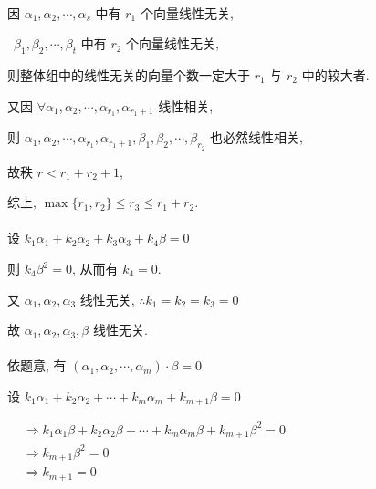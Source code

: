 	 \paragraph{} %
		 因 \( \alpha_{1}, \alpha_{2}, \cdots, \alpha_{s} \) 中有 \( r_{1} \) 个向量线性无关,

		 \quad \   \( \beta_{1}, \beta_{2}, \cdots, \beta_{t} \) 中有 \( r_{2} \) 个向量线性无关,

		 则整体组中的线性无关的向量个数一定大于 \( r_{1} \) 与 \( r_{2} \) 中的较大者.

		 又因 \( \forall \alpha_{1}, \alpha_{2}, \cdots, \alpha_{r_{1}}, \alpha_{r_{1}+1} \) 线性相关,

		 则 \( \alpha_{1}, \alpha_{2}, \cdots, \alpha_{r_{1}}, \alpha_{r_{1}+1}, \beta_{1}, \beta_{2}, \cdots, \beta_{r_{2}} \) 也必然线性相关,

		 故秩 \( r < r_{1} + r_{2} + 1 \),

		 综上, \( \max\{r_{1}, r_{2}\} \leq r_3 \leq r_{1} + r_{2} \).

	 \paragraph{} %
		 设 \( k_{1}\alpha_{1} + k_{2}\alpha_{2} + k_{3}\alpha_{3} + k_{4}\beta = 0 \)

		 则 \(k_{4}\beta^{2} = 0 \), 从而有 \( k_{4} = 0 \).

		 又 \( \alpha_{1}, \alpha_{2}, \alpha_{3} \) 线性无关, \( \therefore k_{1} = k_{2} = k_{3} = 0 \)

		 故 \( \alpha_{1}, \alpha_{2}, \alpha_{3}, \beta \) 线性无关.

	 \paragraph{} %
		 依题意, 有 \( (\alpha_{1}, \alpha_{2}, \cdots, \alpha_{m}) \cdot \beta = 0 \)

		 设 \(k_{1}\alpha_{1} + k_{2}\alpha_{2} + \cdots + k_{m}\alpha_{m} + k_{m+1}\beta = 0\)

		 \(\begin{aligned}
			  & \Rightarrow k_{1}\alpha_{1}\beta + k_{2}\alpha_{2}\beta + \cdots + k_{m}\alpha_{m}\beta + k_{m+1}\beta^{2} = 0 \\
			  & \Rightarrow k_{m+1}\beta^{2} = 0                                                                               \\
			  & \Rightarrow k_{m+1} = 0
		 \end{aligned}\)

